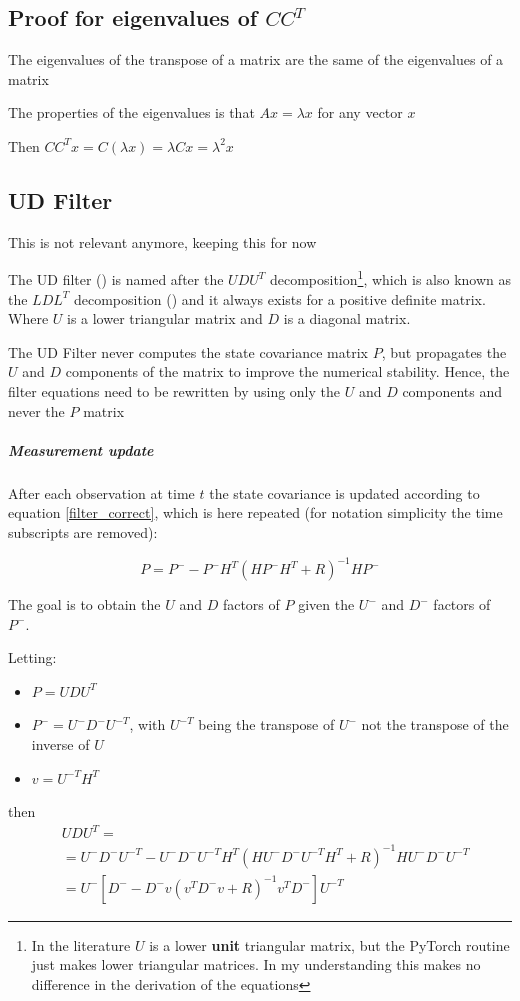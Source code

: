 \documentclass{article}
\let\Oldsubsection\subsection
\renewcommand{\subsection}{\FloatBarrier\Oldsubsection}
\begin{document}
\subsection{Proof for eigenvalues of $CC^T$}

The eigenvalues of the transpose of a matrix are the same of the eigenvalues of a matrix

The properties of the eigenvalues is that $Ax=\lambda x$ for any vector $x$

Then $CC^Tx=C(\lambda x) = \lambda Cx = \lambda^2 x$

\subsection{UD Filter}


This is not relevant anymore, keeping this for now

The UD filter (\cite{bierman_numerical_1977}) is named after the $UDU^T$ decomposition\footnote{In the literature $U$ is a lower \textbf{unit} triangular matrix, but the PyTorch routine just makes lower triangular matrices. In my understanding this makes no difference in the derivation of the equations}, which is also known as the $LDL^T$ decomposition (\cite{golub_matrix_2013}) and it always exists for a positive definite matrix. Where $U$ is a lower triangular matrix and $D$ is a diagonal matrix.

The UD Filter never computes the state covariance matrix $P$, but propagates the $U$ and $D$ components of the matrix to improve the numerical stability. Hence, the filter equations need to be rewritten by using only the $U$ and $D$ components and never the $P$ matrix

\subparagraph{Measurement update}

After each observation at time $t$ the state covariance is updated according to equation \ref{filter_correct}, which is here repeated (for notation simplicity the time subscripts are removed):

$$ P = P^- - P^-H^T(HP^-H^T + R)^{-1}HP^-$$

The goal is to obtain the $U$ and $D$ factors of $P$ given the $U^-$ and $D^-$ factors of $P^-$.

Letting:
\begin{itemize}
    \item $P = UDU^T$
    \item $P^- = U^-D^-U^{-T}$, with $U^{-T}$ being the transpose of $U^-$ not the transpose of the inverse of $U$
    \item $v = U^{-T}H^T$
\end{itemize}
then 
\begin{align}
    &UDU^T = \\
    &= U^-D^-U^{-T} - U^-D^-U^{-T}H^T\left(HU^-D^-U^{-T}H^T + R\right)^{-1}HU^-D^-U^{-T} \\
    &= U^-\left[D^- - D^-v(v^TD^-v+R)^{-1}v^TD^- \right]U^{-T}
\end{align}
\end{document}
